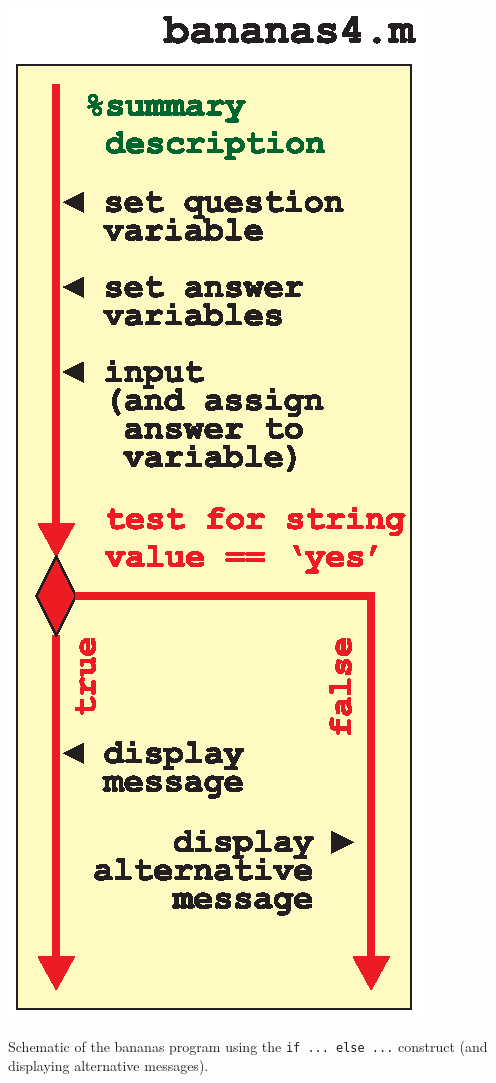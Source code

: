 \documentclass{tufte-book} %
\begin{document}
\begin{marginfigure}[+0.0in]
\includegraphics[width=\linewidth]{ch2-bananas4.eps}
\caption{Schematic of the bananas program using the \texttt{if ... else ...} construct (and displaying alternative messages).}
\label{fig:ch2-bananas4}
\end{marginfigure}
\end{document}
